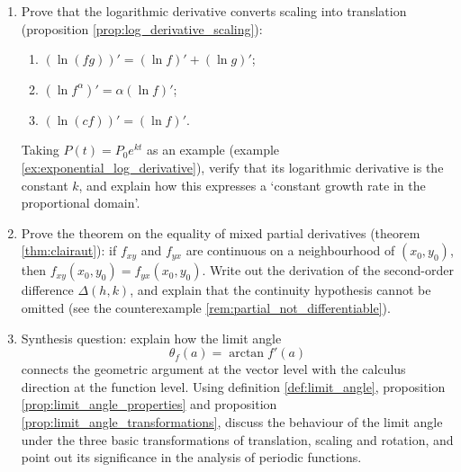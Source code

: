 \begin{enumerate}[leftmargin=3em, label=\textbf{Exercise \arabic*}]
    \item Prove that the logarithmic derivative converts scaling into translation (proposition \ref{prop:log_derivative_scaling}):
    \begin{enumerate}[label=(\roman*)]
        \item $(\ln(fg))'=(\ln f)'+(\ln g)'$;
        \item $(\ln f^\alpha)'=\alpha(\ln f)'$;
        \item $(\ln(cf))'=(\ln f)'$.
    \end{enumerate}
    Taking $P(t)=P_0e^{kt}$ as an example (example \ref{ex:exponential_log_derivative}),
    verify that its logarithmic derivative is the constant $k$, and explain how this expresses a `constant growth rate in the proportional domain'.

    \item Prove the theorem on the equality of mixed partial derivatives (theorem \ref{thm:clairaut}):
    if $f_{xy}$ and $f_{yx}$ are continuous on a neighbourhood of $(x_0,y_0)$,
    then $f_{xy}(x_0,y_0)=f_{yx}(x_0,y_0)$.
    Write out the derivation of the second-order difference $\Delta(h,k)$, and explain that the continuity hypothesis cannot be omitted
    (see the counterexample \ref{rem:partial_not_differentiable}).

    \item Synthesis question: explain how the limit angle
    \[
    \theta_f(a)=\arctan f'(a)
    \]
    connects the geometric argument at the vector level with the calculus direction at the function level.
    Using definition \ref{def:limit_angle}, proposition \ref{prop:limit_angle_properties}
    and proposition \ref{prop:limit_angle_transformations},
    discuss the behaviour of the limit angle under the three basic transformations of translation, scaling and rotation,
    and point out its significance in the analysis of periodic functions.
\end{enumerate}

